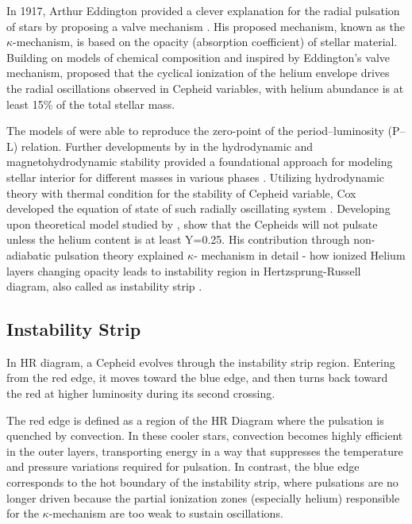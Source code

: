 In 1917, Arthur Eddington provided a clever explanation for the radial pulsation of stars by proposing a valve mechanism \citep{1917eddington}. His proposed mechanism, known as the $\kappa$-mechanism, is based on the opacity (absorption coefficient) of stellar material. Building on models of chemical composition and inspired by Eddington’s valve mechanism, \cite{1953zhevakin} proposed that the cyclical ionization of the helium envelope drives the radial oscillations observed in Cepheid variables, with helium abundance is at least 15\% of the total stellar mass. 


The models of \cite{1959zhevakin} were able to reproduce the zero-point of the period–luminosity (P--L) relation. Further developments by \cite{1949chandrasekhar} in the hydrodynamic and magnetohydrodynamic stability provided a foundational approach for modeling stellar interior for different masses in various phases \citep{1961chandrasekhar}. Utilizing hydrodynamic theory with thermal condition for the stability of Cepheid variable, Cox developed the equation of state of such radially oscillating system \citep{1959cox} . Developing upon theoretical model studied by \cite{1968christy}, \cite{1973cox} show that the Cepheids will not pulsate unless the helium content is at least Y=0.25. His contribution through non-adiabatic pulsation theory explained $\kappa$- mechanism in detail - how ionized Helium layers changing opacity leads to instability region in Hertzsprung-Russell diagram, also called as instability strip \citep{1968cox, 1980cox}. 

\subsection{Instability Strip}
In HR diagram, a Cepheid evolves through the instability strip region. Entering from the red edge, it moves toward the blue edge, and then turns back toward the red at higher luminosity during its second crossing. 


The red edge is defined as a region of the HR Diagram where the pulsation is quenched by convection. In these cooler stars, convection becomes highly efficient in the outer layers, transporting energy in a way that suppresses the temperature and pressure variations required for pulsation. In contrast, the blue edge corresponds to the hot boundary of the instability strip, where pulsations are no longer driven because the partial ionization zones (especially helium) responsible for the $\kappa$-mechanism are too weak to sustain oscillations.

